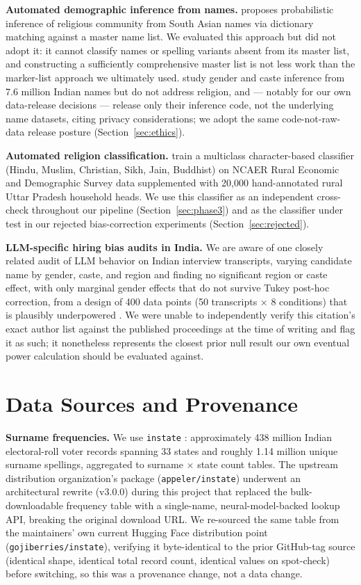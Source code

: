 \documentclass[11pt]{article}
\begin{document}
\textbf{Automated demographic inference from names.} \citet{susewind2015} proposes probabilistic inference of religious community from South Asian names via dictionary matching against a master name list. We evaluated this approach but did not adopt it: it cannot classify names or spelling variants absent from its master list, and constructing a sufficiently comprehensive master list is not less work than the marker-list approach we ultimately used. \citet{vahini2022} study gender and caste inference from 7.6 million Indian names but do not address religion, and --- notably for our own data-release decisions --- release only their inference code, not the underlying name datasets, citing privacy considerations; we adopt the same code-not-raw-data release posture (Section~\ref{sec:ethics}).

\textbf{Automated religion classification.} \citet{chaturvedi2023} train a multiclass character-based classifier (Hindu, Muslim, Christian, Sikh, Jain, Buddhist) on NCAER Rural Economic and Demographic Survey data supplemented with 20,000 hand-annotated rural Uttar Pradesh household heads. We use this classifier as an independent cross-check throughout our pipeline (Section~\ref{sec:phase3}) and as the classifier under test in our rejected bias-correction experiments (Section~\ref{sec:rejected}).

\textbf{LLM-specific hiring bias audits in India.} We are aware of one closely related audit of LLM behavior on Indian interview transcripts, varying candidate name by gender, caste, and region and finding no significant region or caste effect, with only marginal gender effects that do not survive Tukey post-hoc correction, from a design of 400 data points (50 transcripts $\times$ 8 conditions) that is plausibly underpowered \citep{invisiblefilters2025}. We were unable to independently verify this citation's exact author list against the published proceedings at the time of writing and flag it as such; it nonetheless represents the closest prior null result our own eventual power calculation should be evaluated against.

\section{Data Sources and Provenance}
\label{sec:data-sources}

\textbf{Surname frequencies.} We use \texttt{instate} \citep{soodDhingra2023}: approximately 438 million Indian electoral-roll voter records spanning 33 states and roughly 1.14 million unique surname spellings, aggregated to surname $\times$ state count tables. The upstream distribution organization's package (\texttt{appeler/instate}) underwent an architectural rewrite (v3.0.0) during this project that replaced the bulk-downloadable frequency table with a single-name, neural-model-backed lookup API, breaking the original download URL. We re-sourced the same table from the maintainers' own current Hugging Face distribution point (\texttt{gojiberries/instate}), verifying it byte-identical to the prior GitHub-tag source (identical shape, identical total record count, identical values on spot-check) before switching, so this was a provenance change, not a data change.
\end{document}
